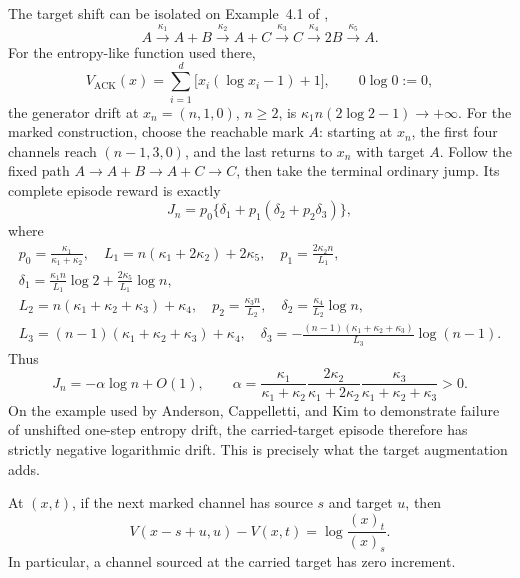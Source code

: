\begin{remark}\label{rem:ack-example}
The target shift can be isolated on Example~4.1 of
\citet{AndersonCappellettiKim2020},
\[
 A\xrightarrow{\kappa_1}A+B\xrightarrow{\kappa_2}A+C
 \xrightarrow{\kappa_3}C\xrightarrow{\kappa_4}2B
 \xrightarrow{\kappa_5}A.
\]
For the entropy-like function used there,
\[
 V_{\mathrm{ACK}}(x)=
 \sum_{i=1}^d\bigl[x_i(\log x_i-1)+1\bigr],
 \qquad 0\log0:=0,
\]
the generator drift at \(x_n=(n,1,0)\), \(n\ge2\), is
\(\kappa_1n(2\log2-1)\to+\infty\).  For the marked construction,
choose the reachable mark \(A\): starting at \(x_n\), the first four channels
reach \((n-1,3,0)\), and the last returns to \(x_n\) with target \(A\).
Follow the fixed path \(A\to A+B\to A+C\to C\), then take the terminal
ordinary jump.  Its complete episode reward is exactly
\begin{equation}\label{eq:ack-episode}
 J_n=p_0\{\delta_1+p_1(\delta_2+p_2\delta_3)\},
\end{equation}
where
\[
\begin{gathered}
 p_0=\frac{\kappa_1}{\kappa_1+\kappa_2},\quad
 L_1=n(\kappa_1+2\kappa_2)+2\kappa_5,\quad
 p_1=\frac{2\kappa_2n}{L_1},\\
 \delta_1=\frac{\kappa_1n}{L_1}\log2
       +\frac{2\kappa_5}{L_1}\log n,\\
 L_2=n(\kappa_1+\kappa_2+\kappa_3)+\kappa_4,\quad
 p_2=\frac{\kappa_3n}{L_2},\quad
 \delta_2=\frac{\kappa_4}{L_2}\log n,\\
 L_3=(n-1)(\kappa_1+\kappa_2+\kappa_3)+\kappa_4,\quad
 \delta_3=-\frac{(n-1)(\kappa_1+\kappa_2+\kappa_3)}{L_3}\log(n-1).
\end{gathered}
\]
Thus
\[
 J_n=-\alpha\log n+O(1),\qquad
 \alpha=\frac{\kappa_1}{\kappa_1+\kappa_2}
        \frac{2\kappa_2}{\kappa_1+2\kappa_2}
        \frac{\kappa_3}{\kappa_1+\kappa_2+\kappa_3}>0.
\]
On the example used by Anderson, Cappelletti, and Kim to demonstrate failure
of unshifted one-step entropy drift, the carried-target episode therefore has
strictly negative logarithmic drift.  This is precisely what the target
augmentation adds.
\end{remark}

\begin{lemma}\label{lem:identity}
At \((x,t)\), if the next marked channel has source \(s\) and target \(u\),
then
\begin{equation}\label{eq:identity}
  V(x-s+u,u)-V(x,t)=\log\frac{(x)_t}{(x)_s}.
\end{equation}
In particular, a channel sourced at the carried target has zero increment.
\end{lemma}

